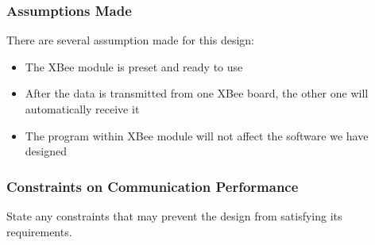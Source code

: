 \documentclass[MTRX3700report.tex]{subfiles}
\begin{document}
\subsubsection{Assumptions Made}
There are several assumption made for this design:
\begin{itemize}
\item The XBee module is preset and ready to use
\item After the data is transmitted from one XBee board, the other one will automatically receive it
\item The program within XBee module will not affect the software we have designed
\end{itemize}
\subsubsection{Constraints on Communication Performance}
State any constraints that may prevent the design from satisfying its requirements.
\end{document}

